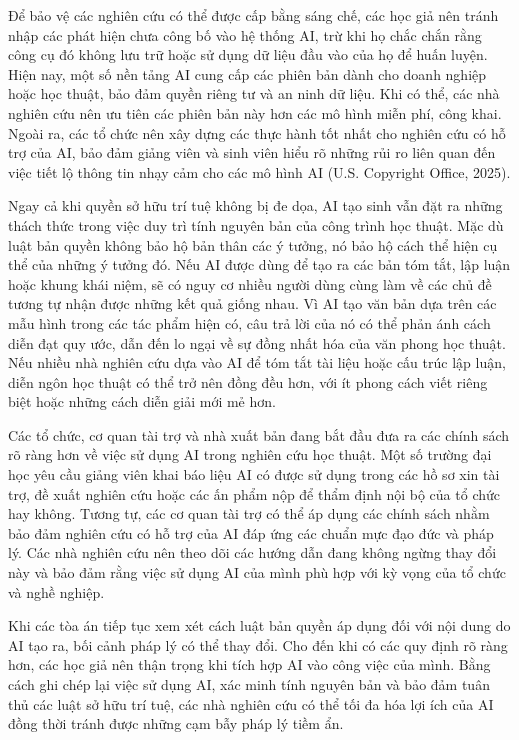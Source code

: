 Để bảo vệ các nghiên cứu có thể được cấp bằng sáng chế, các học giả nên tránh nhập các phát hiện chưa công bố vào hệ thống AI, trừ khi họ chắc chắn rằng công cụ đó không lưu trữ hoặc sử dụng dữ liệu đầu vào của họ để huấn luyện. Hiện nay, một số nền tảng AI cung cấp các phiên bản dành cho doanh nghiệp hoặc học thuật, bảo đảm quyền riêng tư và an ninh dữ liệu. Khi có thể, các nhà nghiên cứu nên ưu tiên các phiên bản này hơn các mô hình miễn phí, công khai. Ngoài ra, các tổ chức nên xây dựng các thực hành tốt nhất cho nghiên cứu có hỗ trợ của AI, bảo đảm giảng viên và sinh viên hiểu rõ những rủi ro liên quan đến việc tiết lộ thông tin nhạy cảm cho các mô hình AI (U.S. Copyright Office, 2025).

Ngay cả khi quyền sở hữu trí tuệ không bị đe dọa, AI tạo sinh vẫn đặt ra những thách thức trong việc duy trì tính nguyên bản của công trình học thuật. Mặc dù luật bản quyền không bảo hộ bản thân các ý tưởng, nó bảo hộ cách thể hiện cụ thể của những ý tưởng đó. Nếu AI được dùng để tạo ra các bản tóm tắt, lập luận hoặc khung khái niệm, sẽ có nguy cơ nhiều người dùng cùng làm về các chủ đề tương tự nhận được những kết quả giống nhau. Vì AI tạo văn bản dựa trên các mẫu hình trong các tác phẩm hiện có, câu trả lời của nó có thể phản ánh cách diễn đạt quy ước, dẫn đến lo ngại về sự đồng nhất hóa của văn phong học thuật. Nếu nhiều nhà nghiên cứu dựa vào AI để tóm tắt tài liệu hoặc cấu trúc lập luận, diễn ngôn học thuật có thể trở nên đồng đều hơn, với ít phong cách viết riêng biệt hoặc những cách diễn giải mới mẻ hơn.

Các tổ chức, cơ quan tài trợ và nhà xuất bản đang bắt đầu đưa ra các chính sách rõ ràng hơn về việc sử dụng AI trong nghiên cứu học thuật. Một số trường đại học yêu cầu giảng viên khai báo liệu AI có được sử dụng trong các hồ sơ xin tài trợ, đề xuất nghiên cứu hoặc các ấn phẩm nộp để thẩm định nội bộ của tổ chức hay không. Tương tự, các cơ quan tài trợ có thể áp dụng các chính sách nhằm bảo đảm nghiên cứu có hỗ trợ của AI đáp ứng các chuẩn mực đạo đức và pháp lý. Các nhà nghiên cứu nên theo dõi các hướng dẫn đang không ngừng thay đổi này và bảo đảm rằng việc sử dụng AI của mình phù hợp với kỳ vọng của tổ chức và nghề nghiệp.

Khi các tòa án tiếp tục xem xét cách luật bản quyền áp dụng đối với nội dung do AI tạo ra, bối cảnh pháp lý có thể thay đổi. Cho đến khi có các quy định rõ ràng hơn, các học giả nên thận trọng khi tích hợp AI vào công việc của mình. Bằng cách ghi chép lại việc sử dụng AI, xác minh tính nguyên bản và bảo đảm tuân thủ các luật sở hữu trí tuệ, các nhà nghiên cứu có thể tối đa hóa lợi ích của AI đồng thời tránh được những cạm bẫy pháp lý tiềm ẩn.

